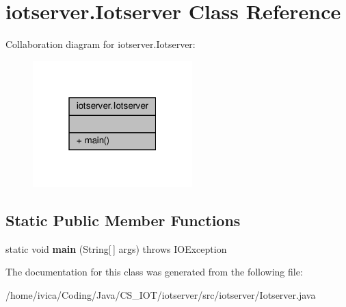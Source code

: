 \hypertarget{classiotserver_1_1Iotserver}{}\section{iotserver.\+Iotserver Class Reference}
\label{classiotserver_1_1Iotserver}


Collaboration diagram for iotserver.\+Iotserver\+:\nopagebreak
\begin{figure}[H]
\begin{center}
\leavevmode
\includegraphics[width=175pt]{classiotserver_1_1Iotserver__coll__graph}
\end{center}
\end{figure}
\subsection*{Static Public Member Functions}
\begin{DoxyCompactItemize}
\item 
\mbox{\label{classiotserver_1_1Iotserver_a81c60de8d7f882697a68e4ec04dcd2d8}} 
static void {\bfseries main} (String\mbox{[}$\,$\mbox{]} args)  throws I\+O\+Exception 
\end{DoxyCompactItemize}


The documentation for this class was generated from the following file\+:\begin{DoxyCompactItemize}
\item 
/home/ivica/\+Coding/\+Java/\+C\+S\+\_\+\+I\+O\+T/iotserver/src/iotserver/Iotserver.\+java\end{DoxyCompactItemize}
